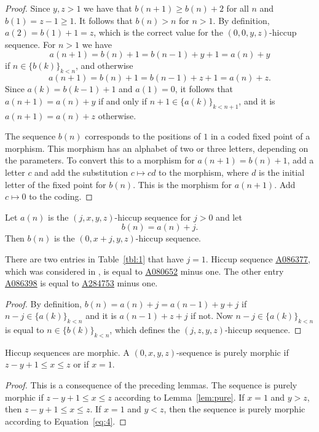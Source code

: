 \documentclass[12pt,reqno]{article}
\newcommand{\seqnum}[1]{\href{https://oeis.org/#1}{\rm \underline{#1}}}
\begin{document}
\begin{proof}
    Since $y,z>1$ we have that $b(n+1)\geq b(n)+2$ for all $n$ and $b(1)=z-1\geq 1$.
    It follows that $b(n)>n$ for $n>1$.
    By definition, $a(2)=b(1)+1=z$, which is the correct value for the $(0,0,y,z)$-hiccup sequence.    
    For $n>1$ we have \[a(n+1)=b(n)+1=b(n-1)+y+1=a(n)+y\] if $n\in \{b(k)\}_{k<n}$, and otherwise 
    \[a(n+1)=b(n)+1=b(n-1)+z+1=a(n)+z.\] 
    Since $a(k)=b(k-1)+1$ and $a(1)=0$, it follows that $a(n+1)=a(n)+y$ if and only if $n+1\in\{a(k)\}_{k<n+1}$,
    and it is $a(n+1)=a(n)+z$ otherwise. 

    The sequence $b(n)$ corresponds to the positions of $1$ in a coded fixed point of a morphism.
    This morphism has an alphabet of two or three letters, depending on
    the parameters. To convert this to a morphism for $a(n+1)=b(n)+1$, add a letter $c$ and add
    the substitution $c\mapsto cd$ to the morphism, 
    where $d$ is the initial letter of the fixed point for $b(n)$.
    This is the morphism for $a(n+1)$.
    Add $c\mapsto 0$ to the coding.
\end{proof}


\begin{lemma}\label{lem:1xyz2}
    Let $a(n)$ is the $(j,x,y,z)$-hiccup sequence for $j>0$ and let
    \[b(n)=a(n)+j.\]
    Then $b(n)$ is the $(0,x+j,y,z)$-hiccup sequence. 
\end{lemma}

There are two entries in Table~\ref{tbl:1} that have $j=1$.
Hiccup sequence \seqnum{A086377}, which was considered in \cite{bosma2018}, is equal to \seqnum{A080652} minus one. 
The other entry \seqnum{A086398} is equal to \seqnum{A284753} minus one.

\begin{proof}
    By definition, $b(n)=a(n)+j=a(n-1)+y+j$ if $n-j\in\{a(k)\}_{k<n}$ and it is $a(n-1)+z+j$ if not.
    Now $n-j\in\{a(k)\}_{k<n}$ is equal to $n\in\{b(k)\}_{k<n}$, which defines the $(j,z,y,z)$-hiccup sequence.
\end{proof}

\begin{theorem}\label{thm:main2}
    Hiccup sequences are morphic. A $(0,x,y,z)$-sequence is purely morphic
    if $z-y+1\leq x\leq z$ or if $x=1$.
\end{theorem}
\begin{proof}
    This is a consequence of the preceding lemmas. The sequence is purely
    morphic if $z-y+1\leq x\leq z$ according to Lemma~\ref{lem:pure}. If
    $x=1$ and $y>z$, then $z-y+1\leq x\leq z$. If $x=1$ and $y<z$, then
    the sequence is purely morphic according to Equation~\ref{eq:4}.
\end{proof}
\end{document}
